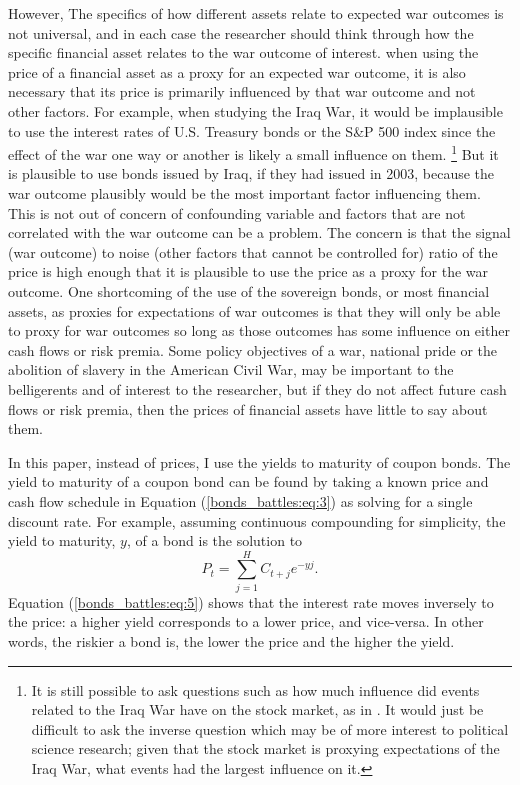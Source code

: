 However, The specifics of how different assets relate to expected war outcomes is not universal, and in each case the researcher should think through how the specific financial asset relates to the war outcome of interest.%
when using the price of a financial asset as a proxy for an expected war outcome, it is also necessary that its price is primarily influenced by that war outcome and not other factors.
For example, when studying the Iraq War, it would be implausible to use the interest rates of U.S. Treasury bonds or the S\&P 500 index since the effect of the war one way or another is likely a small influence on them.%
\footnote{
  It is still possible to ask questions such as how much influence did events related to the Iraq War have on the stock market, as in .
  It would just be difficult to ask the inverse question which may be of more interest to political science research; given that the stock market is proxying expectations of the Iraq War, what events had the largest influence on it.
 }
But it is plausible to use bonds issued by Iraq, if they had issued in 2003, because the war outcome plausibly would be the most important factor influencing them.
This is not out of concern of confounding variable and factors that are not correlated with the war outcome can be a problem.
The concern is that the signal (war outcome) to noise (other factors that cannot be controlled for) ratio of the price is high enough that it is plausible to use the price as a proxy for the war outcome.
One shortcoming of the use of the sovereign bonds, or most financial assets, as proxies for expectations of war outcomes is that they will only be able to proxy for war outcomes so long as those outcomes has some influence on either cash flows or risk premia. 
Some policy objectives of a war, \eg{}national pride or the abolition of slavery in the American Civil War, may be important to the belligerents and of interest to the researcher, but if they do not affect future cash flows or risk premia, then the prices of financial assets have little to say about them.

In this paper, instead of prices, I use the yields to maturity of coupon bonds. 
The yield to maturity of a coupon bond can be found by taking a known price and cash flow schedule in Equation (\ref{bonds_battles:eq:3}) as solving for a single discount rate.
For example, assuming continuous compounding for simplicity, the yield to maturity, $y$, of a bond is the solution to
\begin{equation}
  \label{bonds_battles:eq:5}
  P_{t} = \sum_{j = 1}^{H} C_{t + j} e^{-y j} \text{.}
\end{equation}
Equation (\ref{bonds_battles:eq:5}) shows that the interest rate moves inversely to the price: a higher yield corresponds to a lower price, and vice-versa.
In other words, the riskier a bond is, the lower the price and the higher the yield.




